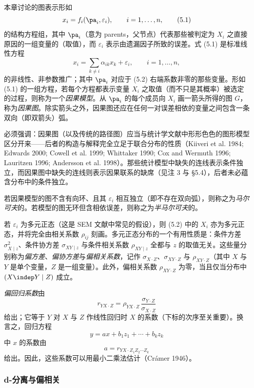 本章讨论的图表示形如
\begin{equation}
x_i=f_i(\pa_i,\varepsilon_i),\qquad i=1,\dots,n, \tag{5.1}
\end{equation}
的结构方程组，其中 $\pa_i$（意为 parents，父节点）代表那些被判定为 $X_i$ 之直接原因的一组变量的（取值），而 $\varepsilon_i$ 表示由遗漏因子所致的误差。式 \textup{(5.1)} 是标准线性方程
\begin{equation}
x_i=\sum_{k\neq i}\alpha_{ik}x_k+\varepsilon_i,\qquad i=1,\dots,n, \tag{5.2}
\end{equation}
的非线性、非参数推广；其中 $\pa_i$ 对应于 \textup{(5.2)} 右端系数非零的那些变量。形如 \textup{(5.1)} 的一组方程，若每个方程都表示变量 $X_i$ 之取值（而不只是其概率）被选定的过程，则称为一个\emph{因果模型}。从 $\pa_i$ 的每个成员向 $X_i$ 画一箭头所得的图 $G$，称为\emph{因果图}。除实箭头之外，因果图还应在任何一对误差相依的变量之间包含一条双向（即双箭头）弧。

必须强调：因果图（以及传统的路径图）应当与统计学文献中形形色色的图形模型区分开来——后者的构造与解释完全立足于联合分布的性质（Kiiveri et al. 1984; Edwards 2000; Cowell et al. 1999; Whittaker 1990; Cox and Wermuth 1996; Lauritzen 1996; Andersson et al. 1998）。那些统计模型中缺失的连线表示条件独立，而因果图中缺失的连线则表示因果联系的缺席（见注 3 与 \S 5.4），后者未必蕴含分布中的条件独立。

若因果模型的图不含有向环、且其 $\varepsilon_i$ 相互独立（即不存在双向弧），则称之为\emph{马尔可夫}的。若模型的图无环但含相依误差，则称之为\emph{半马尔可夫}的。

若 $\varepsilon_i$ 为多元正态（这是 SEM 文献中常见的假设），则 \textup{(5.2)} 中的 $X_i$ 亦为多元正态，并将完全由相关系数 $\rho_{ij}$ 刻画。多元正态分布的一个有用性质是：条件方差 $\sigma^2_{X\mid z}$、条件协方差 $\sigma_{XY\mid z}$ 与条件相关系数 $\rho_{XY\mid z}$ 全都与 $z$ 的取值无关。这些量分别称为\emph{偏方差}、\emph{偏协方差}与\emph{偏相关系数}，记作 $\sigma_{X\cdot Z}$、$\sigma_{XY\cdot Z}$ 与 $\rho_{XY\cdot Z}$（其中 $X$ 与 $Y$ 是单个变量，$Z$ 是一组变量）。此外，偏相关系数 $\rho_{XY\cdot Z}$ 为零，当且仅当分布中 $(X\indep Y\mid Z)$ 成立。

\emph{偏回归系数}由
\[
r_{YX\cdot Z}=\rho_{YX\cdot Z}\,\frac{\sigma_{Y\cdot Z}}{\sigma_{X\cdot Z}}
\]
给出；它等于 $Y$ 对 $X$ 与 $Z$ 作线性回归时 $X$ 的系数（下标的次序至关重要）。换言之，回归方程
\[
y=ax+b_1z_1+\cdots+b_kz_k
\]
中 $x$ 的系数由
\[
a=r_{YX\cdot Z_1Z_2\cdots Z_k}
\]
给出。因此，这些系数可以用最小二乘法估计（Crámer 1946）。

\subsubsection*{d-分离与偏相关}

